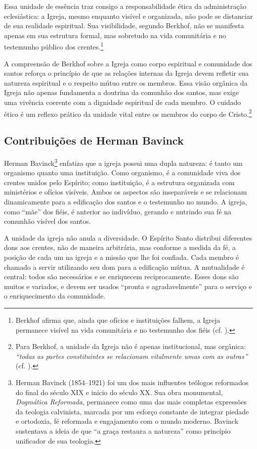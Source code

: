 Essa unidade de essência traz consigo a responsabilidade ética da administração eclesiástica: a Igreja, mesmo enquanto visível e organizada, não pode se distanciar de sua realidade espiritual. Sua visibilidade, segundo Berkhof, não se manifesta apenas em sua estrutura formal, mas sobretudo na vida comunitária e no testemunho público dos crentes.\footnote{Berkhof afirma que, ainda que ofícios e instituições falhem, a Igreja permanece visível na vida comunitária e no testemunho dos fiéis (cf. \cite[p.~645]{berkhof2012}).}

A compreensão de Berkhof sobre a Igreja como corpo espiritual e comunidade dos santos reforça o princípio de que as relações internas da Igreja devem refletir sua natureza espiritual e o respeito mútuo entre os membros. Essa visão orgânica da Igreja não apenas fundamenta a doutrina da comunhão dos santos, mas exige uma vivência coerente com a dignidade espiritual de cada membro. O cuidado ético é um reflexo prático da unidade vital entre os membros do corpo de Cristo.\footnote{Para Berkhof, a unidade da Igreja não é apenas institucional, mas orgânica: \textit{``todas as partes constituintes se relacionam vitalmente umas com as outras''} (cf. \cite[p.~646]{berkhof2012}).}

\subsection{Contribuições de Herman Bavinck}

Herman Bavinck\footnote{Herman Bavinck (1854–1921) foi um dos mais influentes teólogos reformados do final do século XIX e início do século XX. Sua obra monumental, \textit{Dogmática Reformada}, permanece como uma das mais completas expressões da teologia calvinista, marcada por um esforço constante de integrar piedade e ortodoxia, fé reformada e engajamento com o mundo moderno. Bavinck sustentava a ideia de que ``a graça restaura a natureza'' como princípio unificador de sua teologia.} enfatiza que a igreja possui uma dupla natureza: é tanto um organismo quanto uma instituição. Como organismo, é a comunidade viva dos crentes unidos pelo Espírito; como instituição, é a estrutura organizada com ministérios e ofícios visíveis. Ambos os aspectos são inseparáveis e se relacionam dinamicamente para a edificação dos santos e o testemunho no mundo. A igreja, como ``mãe'' dos fiéis, é anterior ao indivíduo, gerando e nutrindo sua fé na comunhão visível dos santos.\cite{bavinck2012}

A unidade da igreja não anula a diversidade. O Espírito Santo distribui diferentes dons aos crentes, não de maneira arbitrária, mas conforme a medida da fé, a posição de cada um na igreja e a missão que lhe foi confiada.\cite{bavinck2012} Cada membro é chamado a servir utilizando seu dom para a edificação mútua. A mutualidade é central: todos são necessários e se enriquecem reciprocamente. Esses dons são muitos e variados, e devem ser usados ``pronta e agradavelmente'' para o serviço e o enriquecimento da comunidade.\cite{bavinck2012}

